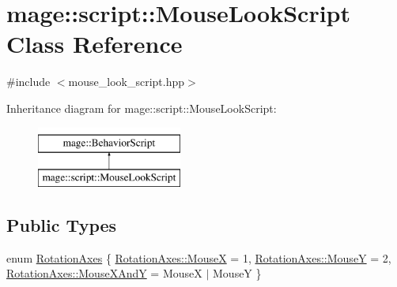 \hypertarget{classmage_1_1script_1_1_mouse_look_script}{}\section{mage\+:\+:script\+:\+:Mouse\+Look\+Script Class Reference}
\label{classmage_1_1script_1_1_mouse_look_script}


{\ttfamily \#include $<$mouse\+\_\+look\+\_\+script.\+hpp$>$}

Inheritance diagram for mage\+:\+:script\+:\+:Mouse\+Look\+Script\+:\begin{figure}[H]
\begin{center}
\leavevmode
\includegraphics[height=2.000000cm]{classmage_1_1script_1_1_mouse_look_script}
\end{center}
\end{figure}
\subsection*{Public Types}
\begin{DoxyCompactItemize}
\item 
enum \hyperlink{classmage_1_1script_1_1_mouse_look_script_aa8c8ce1a3e6ccefa7b8ddd31be209c23}{Rotation\+Axes} \{ \hyperlink{classmage_1_1script_1_1_mouse_look_script_aa8c8ce1a3e6ccefa7b8ddd31be209c23abf27c48f8a38ed19eeeba089dd8d3ba1}{Rotation\+Axes\+::\+MouseX} = 1, 
\hyperlink{classmage_1_1script_1_1_mouse_look_script_aa8c8ce1a3e6ccefa7b8ddd31be209c23a73843207a289db41b16a5bb8254ca425}{Rotation\+Axes\+::\+MouseY} = 2, 
\hyperlink{classmage_1_1script_1_1_mouse_look_script_aa8c8ce1a3e6ccefa7b8ddd31be209c23a109431b32c091e8a7ad541546c66c522}{Rotation\+Axes\+::\+Mouse\+X\+AndY} = MouseX $\vert$ MouseY
 \}
\end{DoxyCompactItemize}
